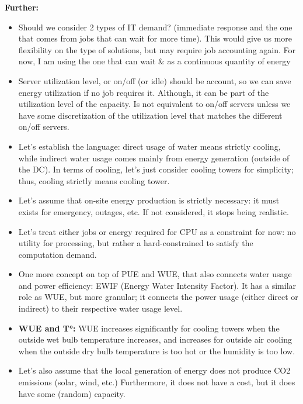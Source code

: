 \documentclass{article}
\begin{document}
{\color{gray}
\textbf{Further:}

\begin{itemize}
    \item Should we consider 2 types of IT demand? (immediate response and the one that comes from jobs that can wait for more time). This would give us more flexibility on the type of solutions, but may require job accounting again. {\color{red} For now, I am using the one that can wait \& as a continuous quantity of energy}
    \item Server utilization level, or on/off (or idle) should be account, so we can save energy utilization if no job requires it. Although, it can be part of the utilization level of the capacity. Is not equivalent to on/off servers unless we have some discretization of the utilization level that matches the different on/off servers. {\color{red} }
    \item Let's establish the language: direct usage of water means strictly cooling, while indirect water usage comes mainly from energy generation (outside of the DC). In terms of cooling, let's just consider cooling towers for simplicity; thus, cooling strictly means cooling tower. 
    \item Let's assume that on-site energy production is strictly necessary: it must exists for emergency, outages, etc. If not considered, it stops being realistic. 
    \item Let's treat either jobs or energy required for CPU as a constraint for now: no utility for processing, but rather a hard-constrained to satisfy the computation demand.
    \item One more concept on top of PUE and WUE, that also connects water usage and power efficiency: EWIF (Energy Water Intensity Factor). It has a similar role as WUE, but more granular; it connects the power usage (either direct or indirect) to their respective water usage level.
    \item \textbf{WUE and T°:} WUE increases significantly for cooling towers when the outside wet bulb temperature increases, and increases for outside air cooling when the outside dry bulb temperature is too hot or the humidity is too low.
    \item Let's also assume that the local generation of energy does not produce CO2 emissions (solar, wind, etc.) Furthermore, it does not have a cost, but it does have some (random) capacity.
\end{itemize}
}


\newpage 
\end{document}
